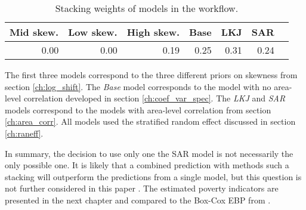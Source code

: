 \begin{table}[ht]
    \caption{Stacking weights of models in the workflow.}
    \begin{center}
        \begin{tabular}{rrrrrrr}
          \hline
         Mid skew. & Low skew. & High skew. & Base & LKJ & SAR \\
          \hline
         0.00 & 0.00 & 0.19 & 0.25 & 0.31 & 0.24 \\
           \hline
        \end{tabular}
    \end{center}

    \begin{adjustwidth}{45pt}{45pt}
        \footnotesize{The first three models correspond to the three different priors on skewness from section \ref{ch:log_shift}. The \textit{Base} model corresponds to the model with no area-level correlation developed in section \ref{ch:coef_var_spec}. The \textit{LKJ} and \textit{SAR} models correspond to the models with area-level correlation from section \ref{ch:area_corr}. All models used the stratified random effect discussed in section \ref{ch:raneff}.}
    \end{adjustwidth}
    \label{tab:stacking}
\end{table}

In summary, the decision to use only one the SAR model is not necessarily the only possible one.
It is likely that a combined prediction with methods such a stacking will outperform the predictions from a single model, but this question is not further considered in this paper .
The estimated poverty indicators are presented in the next chapter and compared to the Box-Cox EBP from \cite{rojas_perilla_data_2020}.

